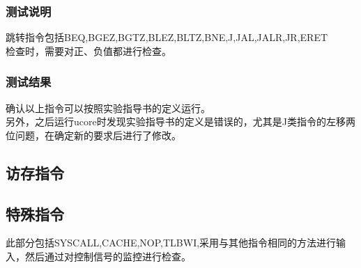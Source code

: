         \subsubsection{测试说明}
        跳转指令包括BEQ,BGEZ,BGTZ,BLEZ,BLTZ,BNE,J,JAL,JALR,JR,ERET \\
        检查时，需要对正、负值都进行检查。

        \subsubsection{测试结果}
        确认以上指令可以按照实验指导书的定义运行。\\
        另外，之后运行ucore时发现实验指导书的定义是错误的，尤其是J类指令的左移两位问题，在确定新的要求后进行了修改。

    \subsection{访存指令}

    \subsection{特殊指令}
        此部分包括SYSCALL,CACHE,NOP,TLBWI,采用与其他指令相同的方法进行输入，然后通过对控制信号的监控进行检查。
